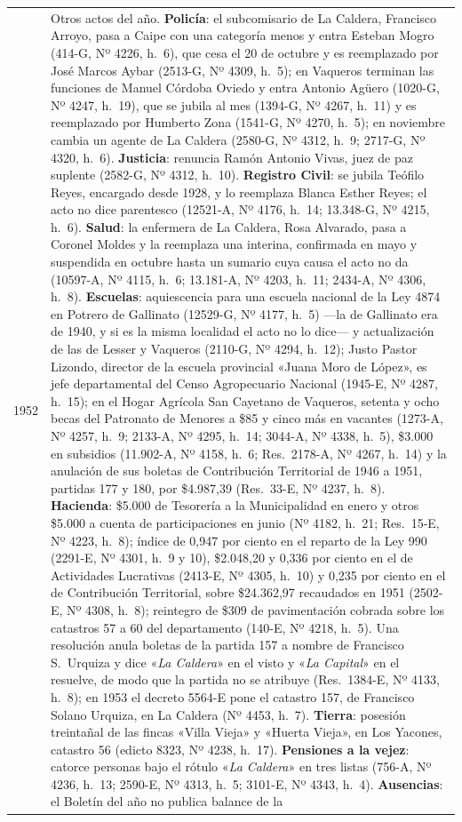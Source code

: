 \begin{longtable}{@{}p{2.7cm}p{10.3cm}@{}}
1952 & Otros actos del año. \textbf{Policía}: el subcomisario de La Caldera, Francisco Arroyo, pasa a Caipe con una categoría menos y entra Esteban Mogro (414-G, Nº 4226, h.\ 6), que cesa el 20 de octubre y es reemplazado por José Marcos Aybar (2513-G, Nº 4309, h.\ 5); en Vaqueros terminan las funciones de Manuel Córdoba Oviedo y entra Antonio Agüero (1020-G, Nº 4247, h.\ 19), que se jubila al mes (1394-G, Nº 4267, h.\ 11) y es reemplazado por Humberto Zona (1541-G, Nº 4270, h.\ 5); en noviembre cambia un agente de La Caldera (2580-G, Nº 4312, h.\ 9; 2717-G, Nº 4320, h.\ 6). \textbf{Justicia}: renuncia Ramón Antonio Vivas, juez de paz suplente (2582-G, Nº 4312, h.\ 10). \textbf{Registro Civil}: se jubila Teófilo Reyes, encargado desde 1928, y lo reemplaza Blanca Esther Reyes; el acto no dice parentesco (12521-A, Nº 4176, h.\ 14; 13.348-G, Nº 4215, h.\ 6). \textbf{Salud}: la enfermera de La Caldera, Rosa Alvarado, pasa a Coronel Moldes y la reemplaza una interina, confirmada en mayo y suspendida en octubre hasta un sumario cuya causa el acto no da (10597-A, Nº 4115, h.\ 6; 13.181-A, Nº 4203, h.\ 11; 2434-A, Nº 4306, h.\ 8). \textbf{Escuelas}: aquiescencia para una escuela nacional de la Ley 4874 en Potrero de Gallinato (12529-G, Nº 4177, h.\ 5) ---la de Gallinato era de 1940, y si es la misma localidad el acto no lo dice--- y actualización de las de Lesser y Vaqueros (2110-G, Nº 4294, h.\ 12); Justo Pastor Lizondo, director de la escuela provincial «Juana Moro de López», es jefe departamental del Censo Agropecuario Nacional (1945-E, Nº 4287, h.\ 15); en el Hogar Agrícola San Cayetano de Vaqueros, setenta y ocho becas del Patronato de Menores a \$85 y cinco más en vacantes (1273-A, Nº 4257, h.\ 9; 2133-A, Nº 4295, h.\ 14; 3044-A, Nº 4338, h.\ 5), \$3.000 en subsidios (11.902-A, Nº 4158, h.\ 6; Res.\ 2178-A, Nº 4267, h.\ 14) y la anulación de sus boletas de Contribución Territorial de 1946 a 1951, partidas 177 y 180, por \$4.987,39 (Res.\ 33-E, Nº 4237, h.\ 8). \textbf{Hacienda}: \$5.000 de Tesorería a la Municipalidad en enero y otros \$5.000 a cuenta de participaciones en junio (Nº 4182, h.\ 21; Res.\ 15-E, Nº 4223, h.\ 8); índice de 0,947 por ciento en el reparto de la Ley 990 (2291-E, Nº 4301, h.\ 9 y 10), \$2.048,20 y 0,336 por ciento en el de Actividades Lucrativas (2413-E, Nº 4305, h.\ 10) y 0,235 por ciento en el de Contribución Territorial, sobre \$24.362,97 recaudados en 1951 (2502-E, Nº 4308, h.\ 8); reintegro de \$309 de pavimentación cobrada sobre los catastros 57 a 60 del departamento (140-E, Nº 4218, h.\ 5). Una resolución anula boletas de la partida 157 a nombre de Francisco S.\ Urquiza y dice «\textit{La Caldera}» en el visto y «\textit{La Capital}» en el resuelve, de modo que la partida no se atribuye (Res.\ 1384-E, Nº 4133, h.\ 8); en 1953 el decreto 5564-E pone el catastro 157, de Francisco Solano Urquiza, en La Caldera (Nº 4453, h.\ 7). \textbf{Tierra}: posesión treintañal de las fincas «Villa Vieja» y «Huerta Vieja», en Los Yacones, catastro 56 (edicto 8323, Nº 4238, h.\ 17). \textbf{Pensiones a la vejez}: catorce personas bajo el rótulo «\textit{La Caldera}» en tres listas (756-A, Nº 4236, h.\ 13; 2590-E, Nº 4313, h.\ 5; 3101-E, Nº 4343, h.\ 4). \textbf{Ausencias}: el Boletín del año no publica balance de la 
\end{longtable}
